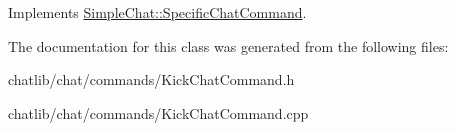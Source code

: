Implements \hyperlink{classSimpleChat_1_1SpecificChatCommand}{Simple\-Chat\-::\-Specific\-Chat\-Command}.



The documentation for this class was generated from the following files\-:\begin{DoxyCompactItemize}
\item 
chatlib/chat/commands/Kick\-Chat\-Command.\-h\item 
chatlib/chat/commands/Kick\-Chat\-Command.\-cpp\end{DoxyCompactItemize}
